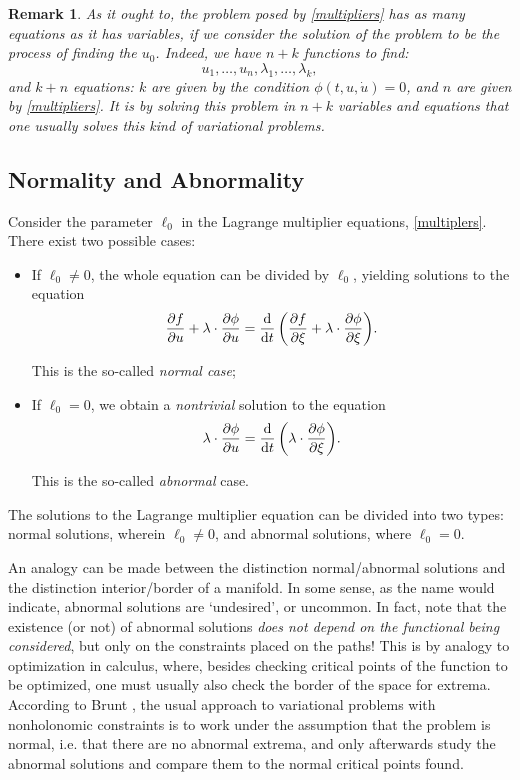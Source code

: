 \documentclass{article}
\theoremstyle{plain}
\theoremstyle{plain}
\newtheorem{remark}{Remark}
\theoremstyle{nonumberplain}
\theoremstyle{empty}
\begin{document}
\begin{remark}
As it ought to, the problem posed by \eqref{multipliers} has as many equations as it has variables, if we consider the solution of the problem to be the process of finding the $u_0$. Indeed, we have $n+k$ functions to find:
\[u_1, \dots, u_n, \lambda_1, \dots, \lambda_k,\]
and $k+n$ equations: $k$ are given by the condition $\phi(t,u,\dot u) = 0$, and $n$ are given by \eqref{multipliers}. It is by solving this problem in $n+k$ variables and equations that one usually solves this kind of variational problems.
\end{remark}

\subsection{Normality and Abnormality}

Consider the parameter $\ell_0$ in the Lagrange multiplier equations, \eqref{multiplers}. There exist two possible cases:
\begin{itemize}
\item If $\ell_0 \neq 0$, the whole equation can be divided by $\ell_0$, yielding solutions to the equation
\begin{equation}\label{multipliers:normal}
\diffp f u + \lambda \cdot \diffp \phi u = \diff*{\left(\diffp f \xi + \lambda \cdot \diffp \phi \xi\right)}t.
\end{equation}

This is the so-called \emph{normal case};

\item If $\ell_0 = 0$, we obtain a \emph{nontrivial} solution to the equation
\begin{equation}\label{multipliers:abnormal}
\lambda \cdot \diffp \phi u = \diff*{\left(\lambda \cdot \diffp \phi \xi\right)}t.
\end{equation}

This is the so-called \emph{abnormal} case.
\end{itemize}

The solutions to the Lagrange multiplier equation can be divided into two types: normal solutions, wherein $\ell_0 \neq 0$, and abnormal solutions, where $\ell_0 = 0$.

An analogy can be made between the distinction normal/abnormal solutions and the distinction interior/border of a manifold. In some sense, as the name would indicate, abnormal solutions are `undesired', or uncommon. In fact, note that the existence (or not) of abnormal solutions \emph{does not depend on the functional being considered}, but only on the constraints placed on the paths! This is by analogy to optimization in calculus, where, besides checking critical points of the function to be optimized, one must usually also check the border of the space for extrema. According to Brunt \cite[p.~129]{brunt}, the usual approach to variational problems with nonholonomic constraints is to work under the assumption that the problem is normal, i.e. that there are no abnormal extrema, and only afterwards study the abnormal solutions and compare them to the normal critical points found.
\end{document}
